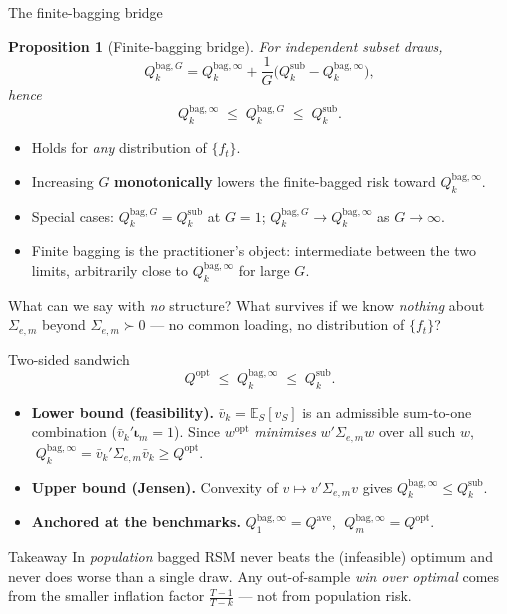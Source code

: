 \documentclass[11pt,aspectratio=169]{beamer}
\newcommand{\Sig}{\Sigma_{e,m}}
\newcommand{\wopt}{w^{\mathrm{opt}}}
\newcommand{\Qopt}{Q^{\mathrm{opt}}}
\newcommand{\Qave}{Q^{\mathrm{ave}}}
\newcommand{\Qsub}{Q_k^{\mathrm{sub}}}
\newcommand{\Qbag}{Q_k^{\mathrm{bag},\infty}}
\newcommand{\QbagG}{Q_k^{\mathrm{bag},G}}
\newcommand{\E}{\mathbb{E}}
\newcommand{\im}{\bm{\iota}_m}
\newtheorem{propositionX}{Proposition}
\begin{document}
\begin{frame}{The finite-bagging bridge}
  \begin{propositionX}[Finite-bagging bridge]
    For independent subset draws,
    \[
      \QbagG=\Qbag+\frac{1}{G}\bigl(\Qsub-\Qbag\bigr),
    \]
    hence
    \[
      \Qbag\;\le\;\QbagG\;\le\;\Qsub .
    \]
  \end{propositionX}
  \begin{itemize}
    \item Holds for \emph{any} distribution of $\{f_t\}$.
    \item Increasing $G$ \textbf{monotonically} lowers the finite-bagged
      risk toward $\Qbag$.
    \item Special cases: $\QbagG=\Qsub$ at $G=1$; $\QbagG\to\Qbag$ as
      $G\to\infty$.
    \item Finite bagging is the practitioner's object: intermediate between
      the two limits, arbitrarily close to $\Qbag$ for large $G$.
  \end{itemize}
\end{frame}

\begin{frame}{What can we say with \emph{no} structure?}
  \footnotesize What survives if we know \emph{nothing} about $\Sig$
  beyond $\Sig\succ0$ --- no common loading, no distribution of $\{f_t\}$?
  \normalsize
  \begin{block}{Two-sided sandwich}
    \[
      \Qopt\;\le\;\Qbag\;\le\;\Qsub .
    \]
  \end{block}
  \begin{itemize}
    \item \textbf{Lower bound (feasibility).} $\bar v_k=\E_S[v_S]$ is an
      admissible sum-to-one combination ($\bar v_k'\im=1$). Since $\wopt$
      \emph{minimises} $w'\Sig w$ over all such $w$,
      $\;\Qbag=\bar v_k'\Sig\bar v_k\ge\Qopt$.
    \item \textbf{Upper bound (Jensen).} Convexity of $v\mapsto v'\Sig v$
      gives $\Qbag\le\Qsub$.
    \item \textbf{Anchored at the benchmarks.}
      $Q_1^{\mathrm{bag},\infty}=\Qave$, $\;Q_m^{\mathrm{bag},\infty}=\Qopt$.
  \end{itemize}
  \begin{alertblock}{Takeaway}
    In \emph{population} bagged RSM never beats the (infeasible) optimum and
    never does worse than a single draw. Any out-of-sample \emph{win over
    optimal} comes from the smaller inflation factor $\tfrac{T-1}{T-k}$ ---
    not from population risk.
  \end{alertblock}
\end{frame}
\end{document}
